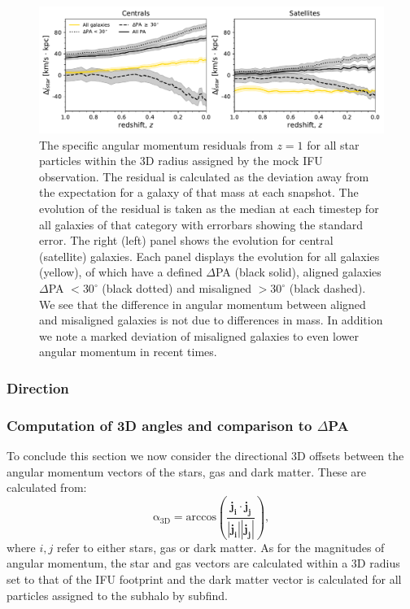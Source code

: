 \begin{figure}
	\includegraphics[width=\linewidth]{misalignment_TNG/delta_j_stars_residuals.pdf}
    \caption{The specific angular momentum residuals from $z=1$ for all star particles within the 3D radius assigned by the mock IFU observation. The residual is calculated as the deviation away from the expectation for a galaxy of that mass at each snapshot. The evolution of the residual is taken as the median at each timestep for all galaxies of that category with errorbars showing the standard error. The right (left) panel shows the evolution for central (satellite) galaxies. Each panel displays the evolution for all galaxies (yellow), of which have a defined $\Delta$PA (black solid), aligned galaxies $\Delta$PA $< 30^{\circ}$ (black dotted) and misaligned $> 30^{\circ}$ (black dashed). We see that the difference in angular momentum between aligned and misaligned galaxies is not due to differences in mass. In addition we note a marked deviation of misaligned galaxies to even lower angular momentum in recent times.}
    \label{fig:sJ_evo_residual}
\end{figure}

\subsubsection{Direction}
\subsubsection{Computation of 3D angles and comparison to $\Delta$PA}
To conclude this section we now consider the directional 3D offsets between the angular momentum vectors of the stars, gas and dark matter. These are calculated from:
\begin{equation} \label{eq:alpha}
\mathrm{\alpha_{3D} = \text{arccos} \left( \frac{\boldsymbol{j_{i}} \cdot \boldsymbol{j_{j}}}{\left| \boldsymbol{j_{i}} \right| \left| \boldsymbol{j_{j}} \right|} \right),}
\end{equation}
where $i, j$ refer to either stars, gas or dark matter. As for the magnitudes of angular momentum, the star and gas vectors are calculated within a 3D radius set to that of the IFU footprint and the dark matter vector is calculated for all particles assigned to the subhalo by subfind.

